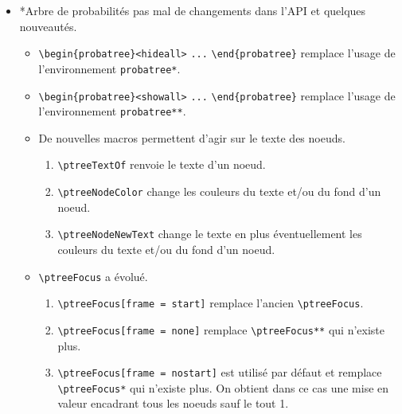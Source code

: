 \documentclass[12pt,a4paper]{article}
\makeatletter
\theoremstyle{definition}
\newcommand\topic{\@ifstar{\@topic@star}{\@topic@no@star}}
\newcommand\@topic@no@star[1]{%
    \textbf{\textsc{#1}.}%
}
\newcommand\@topic@star[1]{%
    \textbf{\textsc{#1} :}%
}
\newcommand\env[1]{\texttt{#1}}
\newcommand\macro[1]{\env{\textbackslash{}#1}}
\makeatother
\begin{document}
\begin{description}
\begin{itemize}[itemsep=.5em]
    
        \item \topic*{Arbre de probabilités}
        	  pas mal de changements dans l'API et quelques nouveautés.
    
        \begin{itemize}[itemsep=.5em]
            \item \verb#\begin{probatree}<hideall># \verb#...# \verb#\end{probatree}#  remplace l'usage de l'environnement \env{probatree*}.
    
    
            \item \verb#\begin{probatree}<showall># \verb#...# \verb#\end{probatree}# remplace l'usage de l'environnement \env{probatree**}.
    
    
            \item De nouvelles macros permettent d'agir sur le texte des noeuds.
    
            \begin{enumerate}
            	\item \macro{ptreeTextOf} renvoie le texte d'un noeud.
    
            	\item \macro{ptreeNodeColor} change les couleurs du texte et/ou du fond d'un noeud.
    
            	\item \macro{ptreeNodeNewText} change le texte en plus éventuellement  les couleurs du texte et/ou du fond d'un noeud.
            \end{enumerate}
    
    
            \item \macro{ptreeFocus} a évolué.
    
            \begin{enumerate}
            	\item \macro{ptreeFocus[frame = start]} remplace l'ancien \macro{ptreeFocus}.
    
            	\item \macro{ptreeFocus[frame = none]} remplace \macro{ptreeFocus**} qui n'existe plus.
    
            	\item \macro{ptreeFocus[frame = nostart]} est utilisé par défaut et remplace \macro{ptreeFocus*} qui n'existe plus. On obtient dans ce cas une mise en valeur encadrant tous les noeuds sauf le tout 1\ier{}.
    

\end{enumerate}
\end{itemize}
\end{itemize}
\end{description}
\end{document}
